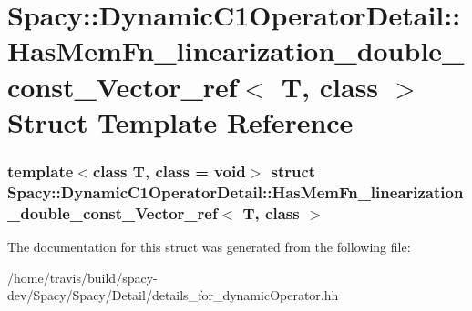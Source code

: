 \hypertarget{structSpacy_1_1DynamicC1OperatorDetail_1_1HasMemFn__linearization__double__const__Vector__ref}{\section{\-Spacy\-:\-:\-Dynamic\-C1\-Operator\-Detail\-:\-:\-Has\-Mem\-Fn\-\_\-linearization\-\_\-double\-\_\-const\-\_\-\-Vector\-\_\-ref$<$ \-T, class $>$ \-Struct \-Template \-Reference}
\label{structSpacy_1_1DynamicC1OperatorDetail_1_1HasMemFn__linearization__double__const__Vector__ref}
}
\subsubsection*{template$<$class T, class = void$>$ struct Spacy\-::\-Dynamic\-C1\-Operator\-Detail\-::\-Has\-Mem\-Fn\-\_\-linearization\-\_\-double\-\_\-const\-\_\-\-Vector\-\_\-ref$<$ T, class $>$}



\-The documentation for this struct was generated from the following file\-:\begin{DoxyCompactItemize}
\item 
/home/travis/build/spacy-\/dev/\-Spacy/\-Spacy/\-Detail/details\-\_\-for\-\_\-dynamic\-Operator.\-hh\end{DoxyCompactItemize}
